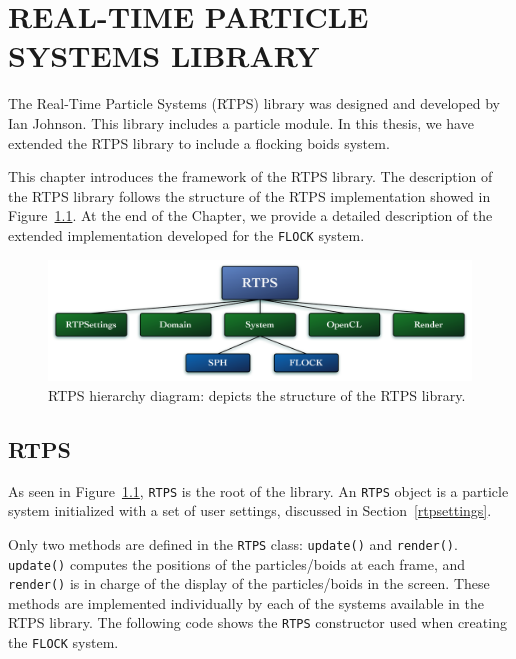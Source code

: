 \chapter{REAL-TIME PARTICLE SYSTEMS LIBRARY}\label{RTPSchapter}

The Real-Time Particle Systems (RTPS) library was designed and developed by Ian Johnson\cite{ianPaper}. This library includes a particle module. In this thesis, we have extended the RTPS library to include a flocking boids system. 

This chapter introduces the framework of the RTPS library. The description of the RTPS library follows the structure of the RTPS implementation showed in Figure~\ref{RTPSdiagram}. At the end of the Chapter, we provide a detailed description of the extended implementation developed for the \texttt{FLOCK} system.

\begin{figure}[htbp]
\begin{center}
\includegraphics[scale=0.38]{figures/RTPSdiagramMyrna.pdf}
\caption{RTPS hierarchy diagram: depicts the structure of the RTPS library.}
\label{RTPSdiagram}
\end{center}
\end{figure}

\section{RTPS}\label{rtpssection}
As seen in Figure~\ref{RTPSdiagram}, \texttt{RTPS} is the root of the library. An \texttt{RTPS} object is a particle system initialized with a set of user settings,  discussed in Section~\ref{rtpsettings}. 

Only two methods are defined in the \texttt{RTPS} class: \texttt{update()} and \texttt{render()}. \texttt{update()} computes the positions of the particles/boids at each frame, and \texttt{render()} is in charge of the display of the particles/boids in the screen. These methods are implemented individually by each of the systems available in the RTPS library. The following code shows the \texttt{RTPS} constructor used when creating the \texttt{FLOCK} system.

